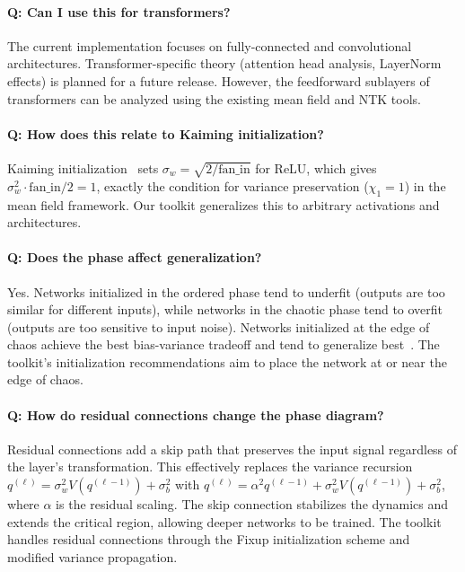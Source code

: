 \documentclass[10pt]{article}
\theoremstyle{definition}
\begin{document}
\paragraph{Q: Can I use this for transformers?}
The current implementation focuses on fully-connected and convolutional architectures.
Transformer-specific theory (attention head analysis, LayerNorm effects) is planned for a future release.
However, the feedforward sublayers of transformers can be analyzed using the existing mean field and NTK tools.

\paragraph{Q: How does this relate to Kaiming initialization?}
Kaiming initialization~\citep{he2015delving} sets $\sigma_w = \sqrt{2/\text{fan\_in}}$ for ReLU, which gives $\sigma_w^2 \cdot \text{fan\_in}/2 = 1$, exactly the condition for variance preservation ($\chi_1 = 1$) in the mean field framework.
Our toolkit generalizes this to arbitrary activations and architectures.

\paragraph{Q: Does the phase affect generalization?}
Yes. Networks initialized in the ordered phase tend to underfit (outputs are too similar for different inputs), while networks in the chaotic phase tend to overfit (outputs are too sensitive to input noise).
Networks initialized at the edge of chaos achieve the best bias-variance tradeoff and tend to generalize best~\citep{schoenholz2017deep}.
The toolkit's initialization recommendations aim to place the network at or near the edge of chaos.

\paragraph{Q: How do residual connections change the phase diagram?}
Residual connections add a skip path that preserves the input signal regardless of the layer's transformation.
This effectively replaces the variance recursion $q^{(\ell)} = \sigma_w^2 V(q^{(\ell-1)}) + \sigma_b^2$ with $q^{(\ell)} = \alpha^2 q^{(\ell-1)} + \sigma_w^2 V(q^{(\ell-1)}) + \sigma_b^2$, where $\alpha$ is the residual scaling.
The skip connection stabilizes the dynamics and extends the critical region, allowing deeper networks to be trained.
The toolkit handles residual connections through the Fixup initialization scheme and modified variance propagation.
\end{document}
